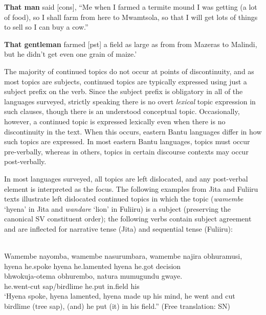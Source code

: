 \documentclass[output=paper]{langsci/langscibook}
\begin{document}
\glt \textbf{\textup{That man}} \textup{said}\textup{ [}\textup{cons}\textup{], “Me when I farmed a termite mound I was getting (a lot of food), so I shall farm from here to Mwamtsola, so that I will get lots of things to sell so I can buy a cow.”}

\glt \textbf{\textup{That gentleman}} \textup{farmed}\textup{ [}\textup{pst}\textup{] a field as large as from from Mazeras to Malindi, but he didn’t get even one grain of maize.’}
\z

The majority of continued topics do not occur at points of discontinuity, and as most topics are subjects, continued topics are typically expressed using just a subject prefix on the verb. Since the subject prefix is obligatory in all of the languages surveyed, strictly speaking there is no overt \textit{lexical} topic expression in such clauses, though there is an understood conceptual topic. Occasionally, however, a continued topic is expressed lexically even when there is no discontinuity in the text. When this occurs, eastern Bantu languages differ in how such topics are expressed. In most eastern Bantu languages, topics must occur pre-verbally, whereas in others, topics in certain discourse contexts may occur post-verbally.

In most languages surveyed, all topics are left dislocated, and any post-verbal element is interpreted as the focus. The following examples from Jita and Fuliiru texts illustrate left dislocated continued topics in which the topic (\textit{wamembe} ‘hyena’ in Jita and \textit{wandare} ‘lion’ in Fuliiru) is a subject (preserving the canonical SV constituent order); the following verbs contain subject agreement and are inflected for narrative tense (Jita) and sequential tense (Fuliiru):

\ea\label{ex:}
\\
\gll Wamembe nayomba, wamembe nasurumbara, wamembe najira obhuramusi,\\
     hyena he.spoke hyena he.lamented hyena he.got decision\\
\gll bhwokuja-otema obhurembo, natura mumugundu gwaye.\\
he.went-cut sap/birdlime he.put in.field his\\


\upshape
‘Hyena spoke, hyena lamented, hyena made up his mind, he went and cut birdlime (tree sap), (and) he put (it) in his field.” (Free translation: SN)
\z
\end{document}
